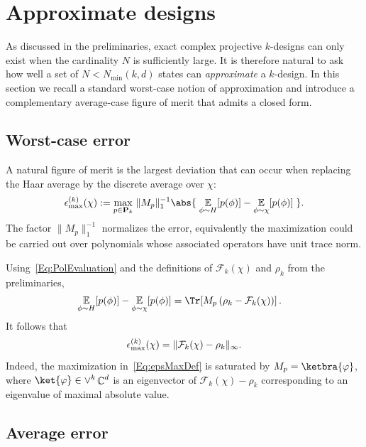 \documentclass[aps,twocolumn,pra,superscriptaddress,nofootinbib]{revtex4-2}
\DeclareMathOperator{\C}{\mathbb{C}} %
\begin{document}
\section{Approximate designs}\label{sec:approximate-designs}

As discussed in the preliminaries, exact complex projective $k$-designs can only exist when the
cardinality $N$ is sufficiently large. It is therefore natural to ask how well a set of
$N<N_{\min}(k,d)$ states can \emph{approximate} a $k$-design. In this section we recall a
standard worst-case notion of approximation and introduce a complementary average-case
figure of merit that admits a closed form.

\subsection{Worst-case error}

A natural figure of merit is the largest deviation that can occur when replacing the Haar average
by the discrete average over $\chi$:
\begin{equation}\label{Eq:epsMaxDef}
  \epsilon_{\rm{max}}^{(k)}(\chi):=
  \underset{p\in \mathbf{P}_{k}}{\max}\;
  \lVert M_{p}\rVert_{{1}}^{-1}
  \abs{\;
    \underset{\phi\sim H}{\mathbb{E}}[p(\phi)]
    -\underset{\phi\sim \chi}{\mathbb{E}}[p(\phi)]
  \;}.
\end{equation}
The factor $\lVert M_{p}\rVert_{{1}}^{-1}$ normalizes the error, equivalently the maximization could be carried out over polynomials {whose associated operators have unit trace norm}.

Using~\eqref{Eq:PolEvaluation} and the definitions of $\mathcal F_k(\chi)$ and $\rho_k$ from the preliminaries,
\begin{align}
\underset{\phi\sim H}{\mathbb{E}}[p(\phi)]
-\underset{\phi\sim\chi}{\mathbb{E}}[p(\phi)]
&=
\Tr\!\left[M_p\left(\rho_k-\mathcal F_k(\chi)\right)\right].
\end{align}
It follows that
\begin{equation}\label{Eq:epsMaxOpNorm}
  \epsilon_{\rm{max}}^{(k)}(\chi)=\lVert \mathcal{F}_{k}(\chi)-\rho_{k}\rVert_{\infty}.
\end{equation}
Indeed, the maximization in~\eqref{Eq:epsMaxDef} is saturated by $M_p=\ketbra{\varphi}$, where
$\ket{\varphi}\in\vee^k\C^d$ is an eigenvector {of $\mathcal F_k(\chi)-\rho_k$ corresponding to an eigenvalue of maximal absolute value}.

\subsection{Average error}
\end{document}
